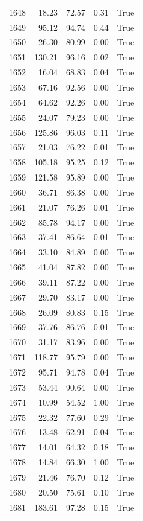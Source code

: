 \begin{longtable}{rrrrr}
1648 & 18.23 & 72.57 & 0.31 & True \\
1649 & 95.12 & 94.74 & 0.44 & True \\
1650 & 26.30 & 80.99 & 0.00 & True \\
1651 & 130.21 & 96.16 & 0.02 & True \\
1652 & 16.04 & 68.83 & 0.04 & True \\
1653 & 67.16 & 92.56 & 0.00 & True \\
1654 & 64.62 & 92.26 & 0.00 & True \\
1655 & 24.07 & 79.23 & 0.00 & True \\
1656 & 125.86 & 96.03 & 0.11 & True \\
1657 & 21.03 & 76.22 & 0.01 & True \\
1658 & 105.18 & 95.25 & 0.12 & True \\
1659 & 121.58 & 95.89 & 0.00 & True \\
1660 & 36.71 & 86.38 & 0.00 & True \\
1661 & 21.07 & 76.26 & 0.01 & True \\
1662 & 85.78 & 94.17 & 0.00 & True \\
1663 & 37.41 & 86.64 & 0.01 & True \\
1664 & 33.10 & 84.89 & 0.00 & True \\
1665 & 41.04 & 87.82 & 0.00 & True \\
1666 & 39.11 & 87.22 & 0.00 & True \\
1667 & 29.70 & 83.17 & 0.00 & True \\
1668 & 26.09 & 80.83 & 0.15 & True \\
1669 & 37.76 & 86.76 & 0.01 & True \\
1670 & 31.17 & 83.96 & 0.00 & True \\
1671 & 118.77 & 95.79 & 0.00 & True \\
1672 & 95.71 & 94.78 & 0.04 & True \\
1673 & 53.44 & 90.64 & 0.00 & True \\
1674 & 10.99 & 54.52 & 1.00 & True \\
1675 & 22.32 & 77.60 & 0.29 & True \\
1676 & 13.48 & 62.91 & 0.04 & True \\
1677 & 14.01 & 64.32 & 0.18 & True \\
1678 & 14.84 & 66.30 & 1.00 & True \\
1679 & 21.46 & 76.70 & 0.12 & True \\
1680 & 20.50 & 75.61 & 0.10 & True \\
1681 & 183.61 & 97.28 & 0.15 & True \\

\end{longtable}
